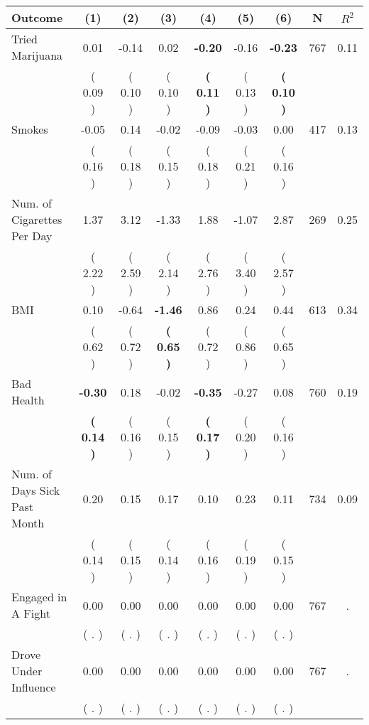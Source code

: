 \begin{tabular}{lcccccccc}
\toprule
 \textbf{Outcome} & \textbf{(1)} & \textbf{(2)} & \textbf{(3)} & \textbf{(4)} & \textbf{(5)} & \textbf{(6)} & \textbf{N} & \textbf{$ R^2$} \\
\midrule
Tried Marijuana &      0.01 &     -0.14 &      0.02 & \textbf{    -0.20} &     -0.16 & \textbf{    -0.23} & 767 &       0.11 \\ 
 & (     0.09 ) & (     0.10 ) & (     0.10 ) & \textbf{(     0.11 )} & (     0.13 ) & \textbf{(     0.10 )} & \\
Smokes &     -0.05 &      0.14 &     -0.02 &     -0.09 &     -0.03 &      0.00 & 417 &       0.13 \\ 
 & (     0.16 ) & (     0.18 ) & (     0.15 ) & (     0.18 ) & (     0.21 ) & (     0.16 ) & \\
Num. of Cigarettes Per Day &      1.37 &      3.12 &     -1.33 &      1.88 &     -1.07 &      2.87 & 269 &       0.25 \\ 
 & (     2.22 ) & (     2.59 ) & (     2.14 ) & (     2.76 ) & (     3.40 ) & (     2.57 ) & \\
BMI &      0.10 &     -0.64 & \textbf{    -1.46} &      0.86 &      0.24 &      0.44 & 613 &       0.34 \\ 
 & (     0.62 ) & (     0.72 ) & \textbf{(     0.65 )} & (     0.72 ) & (     0.86 ) & (     0.65 ) & \\
Bad Health & \textbf{    -0.30} &      0.18 &     -0.02 & \textbf{    -0.35} &     -0.27 &      0.08 & 760 &       0.19 \\ 
 & \textbf{(     0.14 )} & (     0.16 ) & (     0.15 ) & \textbf{(     0.17 )} & (     0.20 ) & (     0.16 ) & \\
Num. of Days Sick Past Month &      0.20 &      0.15 &      0.17 &      0.10 &      0.23 &      0.11 & 734 &       0.09 \\ 
 & (     0.14 ) & (     0.15 ) & (     0.14 ) & (     0.16 ) & (     0.19 ) & (     0.15 ) & \\
Engaged in A Fight &      0.00 &      0.00 &      0.00 &      0.00 &      0.00 &      0.00 & 767 &          . \\ 
 & (        . ) & (        . ) & (        . ) & (        . ) & (        . ) & (        . ) & \\
Drove Under Influence &      0.00 &      0.00 &      0.00 &      0.00 &      0.00 &      0.00 & 767 &          . \\ 
 & (        . ) & (        . ) & (        . ) & (        . ) & (        . ) & (        . ) & \\

\end{tabular}
